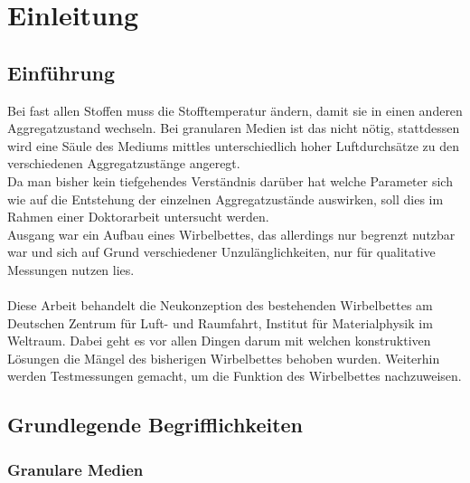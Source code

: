 \chapter{Einleitung}


\section{Einführung}

Bei fast allen Stoffen muss die Stofftemperatur ändern, damit sie in einen anderen Aggregatzustand wechseln. Bei granularen Medien ist das nicht nötig, stattdessen wird eine Säule des Mediums mittles unterschiedlich hoher Luftdurchsätze zu den verschiedenen Aggregatzustänge angeregt. \\
Da man bisher kein tiefgehendes Verständnis darüber hat welche Parameter sich wie auf die Entstehung der einzelnen Aggregatzustände auswirken, soll dies im Rahmen einer Doktorarbeit untersucht werden. \\
Ausgang war ein Aufbau eines Wirbelbettes, das allerdings nur begrenzt nutzbar war und sich auf Grund verschiedener Unzulänglichkeiten, nur für qualitative Messungen nutzen lies. \\
\hfill \\
Diese Arbeit behandelt die Neukonzeption des bestehenden Wirbelbettes am Deutschen Zentrum für Luft- und Raumfahrt, Institut für Materialphysik im Weltraum. Dabei geht es vor allen Dingen darum mit welchen konstruktiven Lösungen die Mängel des bisherigen Wirbelbettes behoben wurden. Weiterhin werden Testmessungen gemacht, um die Funktion des Wirbelbettes nachzuweisen.



\section{Grundlegende Begrifflichkeiten}

\subsection{Granulare Medien}

